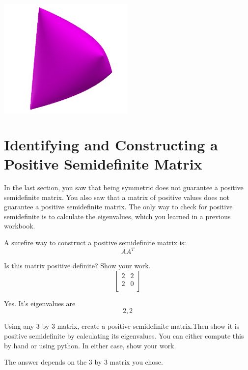 \includegraphics[width=0.5\textwidth]{elliptope.jpg}

\section{Identifying and Constructing a Positive Semidefinite Matrix}
In the last section, you saw that being symmetric does not guarantee a positive semidefinite matrix. You also saw that a matrix of positive values does not guarantee a positive semidefinite matrix. The only way to check for positive semidefinite is to calculate the eigenvalues, which you learned in a previous workbook.

A surefire way to construct a positive semidefinite matrix is:
$$AA^{T}$$

\begin{Exercise}[title={Figuring out if a matrix is positive semidefinite}, label=pos-matrix-01]
Is this matrix positive definite? Show your work.
$$
\begin{bmatrix}
 2  & 2 \\
 2  & 0 \\
\end{bmatrix}
$$
\end{Exercise}

\begin{Answer}[ref=pos-matrix-01]
Yes. It's eigenvalues are $$2,2$$
\end{Answer}
  
\begin{Exercise}[title={Creating a positive semidefinite matrix}, label=pos-matrix-02]
Using any 3 by 3 matrix, create a positive semidefinite matrix.Then show it is positive semidefinite by calculating its eigenvalues.  You can either compute this by hand or using python.  In either case, show your work.
\end{Exercise}

\begin{Answer}[ref=pos-matrix-02]
The answer depends on the 3 by 3 matrix you chose.
\end{Answer}

